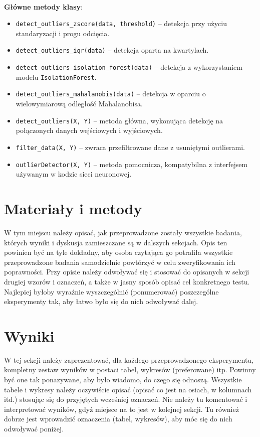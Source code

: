 \documentclass{classrep}
\begin{document}
\paragraph{}
\textbf{Główne metody klasy}:
\begin{itemize}
	\item \texttt{detect\_outliers\_zscore(data, threshold)} – detekcja przy użyciu standaryzacji i progu odcięcia.
	\item \texttt{detect\_outliers\_iqr(data)} – detekcja oparta na kwartylach.
	\item \texttt{detect\_outliers\_isolation\_forest(data)} – detekcja z wykorzystaniem modelu \texttt{IsolationForest}.
	\item \texttt{detect\_outliers\_mahalanobis(data)} – detekcja w oparciu o wielowymiarową odległość Mahalanobisa.
	\item \texttt{detect\_outliers(X, Y)} – metoda główna, wykonująca detekcję na połączonych danych wejściowych i wyjściowych.
	\item \texttt{filter\_data(X, Y)} – zwraca przefiltrowane dane z usuniętymi outlierami.
	\item \texttt{outlierDetector(X, Y)} – metoda pomocnicza, kompatybilna z interfejsem używanym w kodzie sieci neuronowej.
\end{itemize}

\clearpage{}

\section{Materiały i metody}
 {\color{blue}
  W tym miejscu należy opisać, jak przeprowadzone zostały wszystkie badania,
  których wyniki i dyskusja zamieszczane są w dalszych sekcjach. Opis ten
  powinien być na tyle dokładny, aby osoba czytająca go potrafiła wszystkie
  przeprowadzone badania samodzielnie powtórzyć w celu zweryfikowania ich
  poprawności. Przy opisie należy odwoływać się i stosować do
  opisanych w sekcji drugiej wzorów i oznaczeń, a także w jasny sposób opisać
  cel konkretnego testu. Najlepiej byłoby wyraźnie wyszczególnić (ponumerować)
  poszczególne eksperymenty tak, aby łatwo było się do nich odwoływać dalej.}

\section{Wyniki}
 {\color{blue}
  W tej sekcji należy zaprezentować, dla każdego przeprowadzonego eksperymentu,
  kompletny zestaw wyników w postaci tabel, wykresów (preferowane) itp. Powinny
  być one tak ponazywane, aby było wiadomo, do czego się odnoszą. Wszystkie
  tabele i wykresy należy oczywiście opisać (opisać co jest na osiach, w
  kolumnach itd.) stosując się do przyjętych wcześniej oznaczeń. Nie należy tu
  komentować i interpretować wyników, gdyż miejsce na to jest w kolejnej sekcji.
  Tu również dobrze jest wprowadzić oznaczenia (tabel, wykresów), aby móc się do
  nich odwoływać poniżej.}
\end{document}
